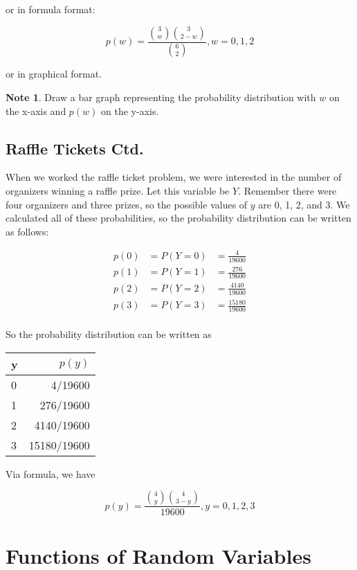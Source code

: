 \documentclass[11pt]{article}
\theoremstyle{definition}
\newtheorem{note}{Note}
\begin{document}
\noindent or in formula format:

$$
	p(w) = \frac{{3 \choose w}{3 \choose 2-w}}{{6 \choose 2}}, w = 0, 1, 2
$$

\noindent or in graphical format.

\begin{note}
	Draw a bar graph representing the probability distribution with $w$ on the x-axis and $p(w)$ on the y-axis.
\end{note}

\subsection{Raffle Tickets Ctd.}

When we worked the raffle ticket problem, we were interested in the number of organizers winning a raffle prize. Let this variable be $Y$. Remember there were four organizers and three prizes, so the possible values of $y$ are 0, 1, 2, and 3. We calculated all of these probabilities, so the probability distribution can be written as follows:

$$
	\begin{aligned}
		p(0) & = P(Y = 0) & = \frac{4}{19600} \\
		p(1) & = P(Y = 1) & = \frac{276}{19600} \\
		p(2) & = P(Y = 2) & = \frac{4140}{19600} \\
		p(3) & = P(Y = 3) & = \frac{15180}{19600} \\
	\end{aligned}
$$

So the probability distribution can be written as

\begin{table}[h]
	\centering
	\begin{tabular}{lr}
		\hline
		y & $p(y)$ \\
		\hline
		0 & 4/19600 \\
		1 & 276/19600 \\
		2 & 4140/19600 \\
		3 & 15180/19600 \\
		\hline
	\end{tabular}
\end{table}

\noindent Via formula, we have

$$
	p(y) = \frac{{4 \choose y}{4 \choose 3-y}}{19600}, y=0, 1, 2, 3
$$

\section{Functions of Random Variables}
\end{document}
